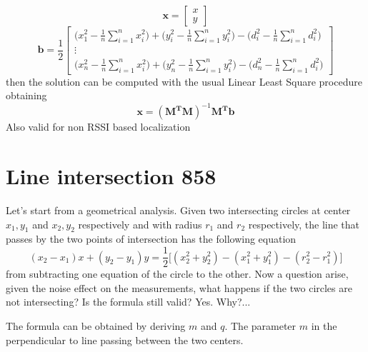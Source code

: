 \documentclass[12pt,twoside]{report}
\begin{document}
$$
\mathbf{x}=\begin{bmatrix}
    x\\
    y
\end{bmatrix}
$$
$$\mathbf{b}=\frac{1}{2}
\begin{bmatrix}
\bigg(x_1^2-\frac{1}{n}\sum_{i=1}^nx^2_i\bigg)+\bigg(y_i^2-\frac{1}{n}\sum_{i=1}^ny^2_i\bigg)-\bigg(d_i^2-\frac{1}{n}\sum_{i=1}^nd_i^2\bigg)\\
\vdots\\
\bigg(x_n^2-\frac{1}{n}\sum_{i=1}^nx^2_i\bigg)+\bigg(y_n^2-\frac{1}{n}\sum_{i=1}^ny^2_i\bigg)-\bigg(d_n^2-\frac{1}{n}\sum_{i=1}^nd_i^2\bigg)
\end{bmatrix}
$$
then the solution can be computed with the usual Linear Least Square procedure obtaining
\begin{equation}
    \mathbf{x}=(\mathbf{M^TM})^{-1}\mathbf{M^Tb}
\end{equation}
Also valid for non RSSI based localization
\clearpage


\section{Line intersection 858}
Let's start from a geometrical analysis. Given two intersecting circles at center $x_{1},y_{1}$ and $x_{2},y_{2}$ respectively and with radius $r_1$ and $r_2$ respectively, the line that passes by the two points of intersection has the following equation
\begin{equation}
    (x_2-x_1)x+(y_2-y_1)y=\frac{1}{2}\big[(x_2^2+y_2^2)-(x_1^2+y_1^2)-(r_2^2-r_1^2)\big]
\end{equation}
from subtracting one equation of the circle to the other. Now a question arise, given the noise effect on the measurements, what happens if the two circles are not intersecting? Is the formula still valid? Yes. Why?... 

The formula can be obtained by deriving $m$ and $q$. The parameter $m$ in the perpendicular to line passing between the two centers.
\end{document}
